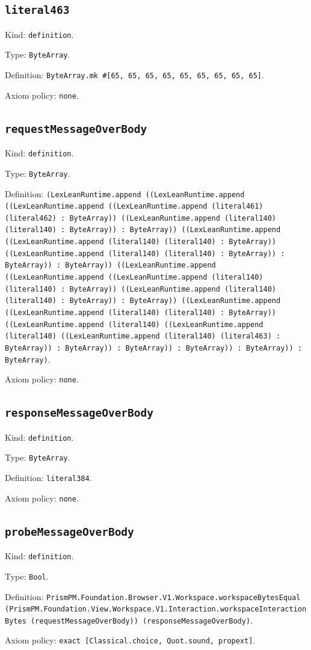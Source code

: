 \documentclass[11pt]{article}
\begin{document}
\subsection*{\texttt{literal463}}
\noindent Kind: \texttt{definition}.\par
\noindent Type: \texttt{ByteArray}.\par
\noindent Definition: \texttt{ByteArray.mk \#[65, 65, 65, 65, 65, 65, 65, 65, 65]}.\par
\noindent Axiom policy: \texttt{none}.\par
\subsection*{\texttt{requestMessageOverBody}}
\noindent Kind: \texttt{definition}.\par
\noindent Type: \texttt{ByteArray}.\par
\noindent Definition: \texttt{(LexLeanRuntime.append ((LexLeanRuntime.append ((LexLeanRuntime.append ((LexLeanRuntime.append (literal461) (literal462) : ByteArray)) ((LexLeanRuntime.append (literal140) (literal140) : ByteArray)) : ByteArray)) ((LexLeanRuntime.append ((LexLeanRuntime.append (literal140) (literal140) : ByteArray)) ((LexLeanRuntime.append (literal140) (literal140) : ByteArray)) : ByteArray)) : ByteArray)) ((LexLeanRuntime.append ((LexLeanRuntime.append ((LexLeanRuntime.append (literal140) (literal140) : ByteArray)) ((LexLeanRuntime.append (literal140) (literal140) : ByteArray)) : ByteArray)) ((LexLeanRuntime.append ((LexLeanRuntime.append (literal140) (literal140) : ByteArray)) ((LexLeanRuntime.append (literal140) ((LexLeanRuntime.append (literal140) ((LexLeanRuntime.append (literal140) (literal463) : ByteArray)) : ByteArray)) : ByteArray)) : ByteArray)) : ByteArray)) : ByteArray)}.\par
\noindent Axiom policy: \texttt{none}.\par
\subsection*{\texttt{responseMessageOverBody}}
\noindent Kind: \texttt{definition}.\par
\noindent Type: \texttt{ByteArray}.\par
\noindent Definition: \texttt{literal384}.\par
\noindent Axiom policy: \texttt{none}.\par
\subsection*{\texttt{probeMessageOverBody}}
\noindent Kind: \texttt{definition}.\par
\noindent Type: \texttt{Bool}.\par
\noindent Definition: \texttt{PrismPM.Foundation.Browser.V1.Workspace.workspaceBytesEqual (PrismPM.Foundation.View.Workspace.V1.Interaction.workspaceInteractionBytes (requestMessageOverBody)) (responseMessageOverBody)}.\par
\noindent Axiom policy: \texttt{exact [Classical.choice, Quot.sound, propext]}.\par
\end{document}
